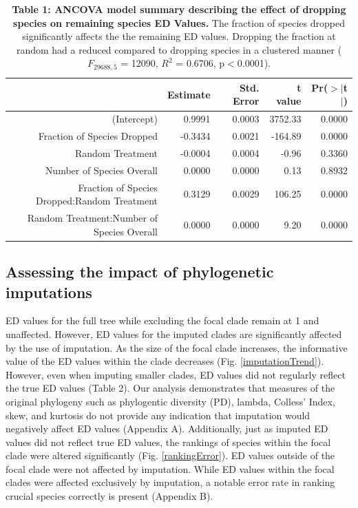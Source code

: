 \documentclass[12pt,english]{article}
\begin{document}
\begin{table}[ht]
  \centering
  \begin{tabular}{rrrrr}
    \hline
   & Estimate & Std. Error & t value & Pr($>$$|$t$|$) \\
    \hline
  (Intercept) & 0.9991 & 0.0003 & 3752.33 & 0.0000 \\
    Fraction of Species Dropped & -0.3434 & 0.0021 & -164.89 & 0.0000 \\
    Random Treatment & -0.0004 & 0.0004 & -0.96 & 0.3360 \\
    Number of Species Overall & 0.0000 & 0.0000 & 0.13 & 0.8932 \\
    Fraction of Species Dropped:Random Treatment & 0.3129 & 0.0029 & 106.25 & 0.0000 \\
    Random Treatment:Number of Species Overall & 0.0000 & 0.0000 & 9.20 & 0.0000 \\
     \hline
     \hline
  \end{tabular}
  \caption*{\textbf{Table 1: ANCOVA model summary describing the effect of 
  dropping species on remaining species ED Values.} The fraction of species 
  dropped significantly affects the the remaining ED values. Dropping the 
  fraction at random had a reduced compared to dropping species in a clustered 
  manner ($F_{29688, 5}$ = 12090, $R^{2}$ = 0.6706, p$<$0.0001).}
  \end{table}

\subsection*{Assessing the impact of phylogenetic imputations}

ED values for the full tree while excluding the focal clade remain at
1 and unaffected. However, ED values for the imputed clades are
significantly affected by the use of imputation. As the size of the
focal clade increases, the informative value of the ED values within the clade 
decreases (Fig. \ref{imputationTrend}). However, even when imputing smaller 
clades, ED values did not regularly reflect the true ED values (Table 2). 
Our analysis demonstrates that measures of the original phylogeny such as 
phylogentic diversity (PD), lambda, Colless' Index, skew, and kurtosis do not provide any 
indication that imputation would negatively affect ED values (Appendix A). Additionally, just as imputed 
ED values did not reflect true ED values, the rankings of species within the 
focal clade were altered significantly (Fig. \ref{rankingError}). ED values 
outside of the focal clade were not affected by imputation. While ED values 
within the focal clades were affected exclusively by imputation, a notable 
error rate in ranking crucial species correctly is present (Appendix B). 
\end{document}
